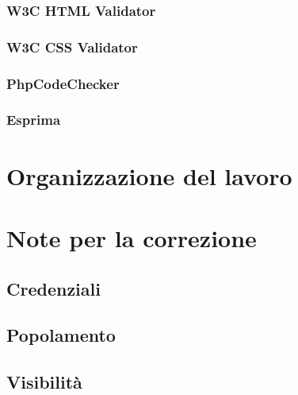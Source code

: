 \documentclass[a4paper]{article}
\begin{document}
			\subsubsection{W3C HTML Validator}
				
			\subsubsection{W3C CSS Validator}
				
			\subsubsection{PhpCodeChecker}
				
			\subsubsection{Esprima}
				
				
	\newpage

	\section{Organizzazione del lavoro}
		
	
	\newpage
	
	\appendix
	\section{Note per la correzione}
		
		\subsection{Credenziali}
			
		\subsection{Popolamento}
			
		\subsection{Visibilità}
			
    
\end{document}
